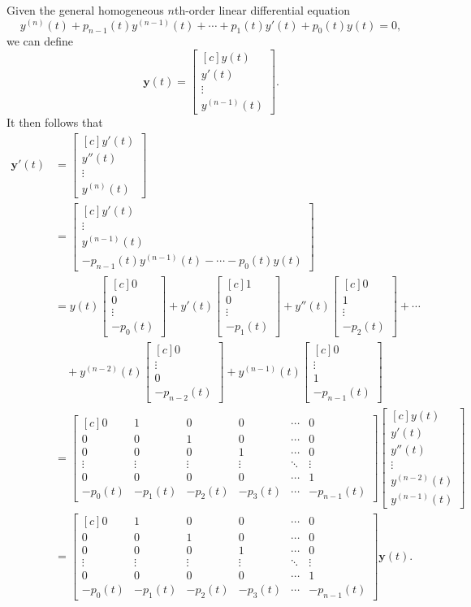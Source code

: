 \documentclass{myart}
\renewcommand{\vec}[1]{\mathbf{#1}}
\newcommand{\mat}[2][r]{\begin{bmatrix*}[#1] #2 \end{bmatrix*}}
\begin{document}
Given the general homogeneous $n$th-order linear differential equation
\begin{equation*}
y^{(n)}(t) + p_{n-1}(t) y^{(n-1)}(t) + \cdots + p_1(t) y'(t) + p_0(t) y(t) = 0,
\end{equation*}
we can define
\begin{equation*}
\vec y(t) = \mat[c]{y(t) \\ y'(t) \\ \vdots \\ y^{(n-1)}(t)}.
\end{equation*}
It then follows that
\begin{align*}
\vec y'(t) &= \mat[c]{y'(t) \\ y''(t) \\ \vdots \\ y^{(n)}(t)} \\
&= \mat[c]{y'(t) \\ \vdots \\ y^{(n-1)}(t) \\ -p_{n-1}(t) y^{(n-1)}(t) - \cdots - p_0(t)y(t)} \\
&= y(t) \mat[c]{0 \\ 0 \\ \vdots \\ -p_0(t)} + y'(t) \mat[c]{1 \\ 0 \\ \vdots \\ -p_1(t)} + y''(t) \mat[c]{0 \\ 1 \\ \vdots \\ -p_2(t)} + \cdots \\
&\quad + y^{(n-2)}(t) \mat[c]{0 \\ \vdots \\ 0 \\ -p_{n-2}(t)} + y^{(n-1)}(t) \mat[c]{0 \\ \vdots \\ 1 \\ -p_{n-1}(t)} \\
&= \mat[c]{
0 & 1 & 0 & 0 & \cdots & 0 \\
0 & 0 & 1 & 0 & \cdots & 0 \\
0 & 0 & 0 & 1 & \cdots & 0 \\
\vdots & \vdots & \vdots & \vdots & \ddots & \vdots \\
0 & 0 & 0 & 0 & \cdots & 1 \\
-p_0(t) & -p_1(t) & -p_2(t) & -p_3(t) & \cdots & -p_{n-1}(t)
} \mat[c]{y(t) \\ y'(t) \\ y''(t) \\ \vdots \\ y^{(n-2)}(t) \\ y^{(n-1)}(t)} \\
&= \mat[c]{
0 & 1 & 0 & 0 & \cdots & 0 \\
0 & 0 & 1 & 0 & \cdots & 0 \\
0 & 0 & 0 & 1 & \cdots & 0 \\
\vdots & \vdots & \vdots & \vdots & \ddots & \vdots \\
0 & 0 & 0 & 0 & \cdots & 1 \\
-p_0(t) & -p_1(t) & -p_2(t) & -p_3(t) & \cdots & -p_{n-1}(t)
} \vec y(t).
\end{align*}
\end{document}
